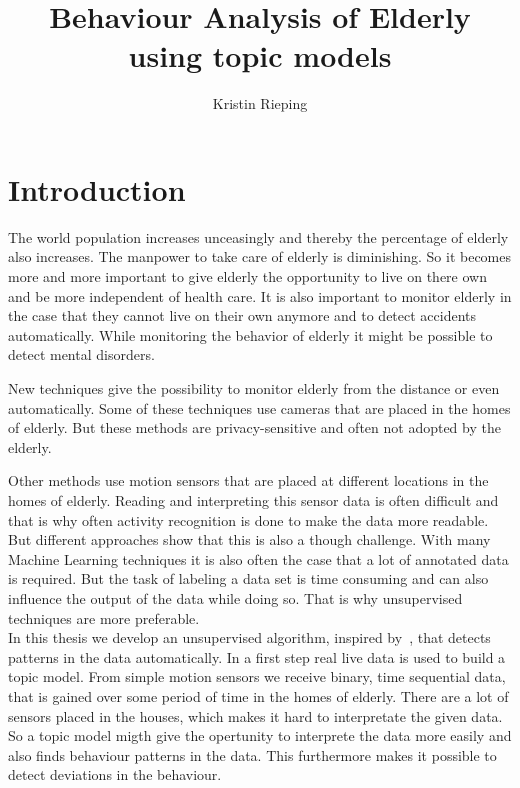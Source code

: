 \documentclass[11pt,a4paper]{article}
\title{Behaviour Analysis of Elderly using topic models}
\author{Kristin Rieping}
\begin{document}
\maketitle
\pagebreak
\tableofcontents
\pagebreak
\section{Introduction}
The world population increases unceasingly and thereby the percentage of elderly also increases. The manpower to take care of elderly is diminishing. So it becomes more and more important to give elderly the opportunity to live on there own and be more independent of health care. It is also important to monitor elderly in the case that they cannot live on their own anymore and to detect accidents automatically. While monitoring the behavior of elderly it might be possible to detect mental disorders.

New techniques give the possibility to monitor elderly from the distance or even automatically. Some of these techniques use cameras that are placed in the homes of elderly. But these methods are privacy-sensitive and often not adopted by the elderly.

Other methods use motion sensors that are placed at different locations in the homes of elderly. %
Reading and interpreting this sensor data is often difficult and that is why often activity recognition is done to make the data more readable. But different approaches show that this is also a though challenge.
With many Machine Learning techniques it is also often the case that a lot of annotated data is required.  But the task of labeling a data set is time consuming and can also influence the output of the data while doing so. That is why unsupervised techniques are more preferable.\\



In this thesis we develop an unsupervised algorithm, inspired by~\cite{farrahi2008daily}, that detects patterns in the data automatically.
In a first step real live data is used to build a topic model. From simple motion sensors we receive binary, time sequential data, that is gained over some period of time in the homes of elderly. There are a lot of sensors placed in the houses, which makes it hard to interpretate the given data. So a topic model migth give the opertunity to interprete the data more easily and also finds behaviour patterns in the data. This furthermore makes it possible to detect deviations in the behaviour.\\
\end{document}
